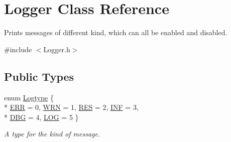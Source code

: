 \hypertarget{classLogger}{\section{Logger Class Reference}
\label{classLogger}
}


Prints messages of different kind, which can all be enabled and disabled.  




{\ttfamily \#include $<$Logger.\-h$>$}

\subsection*{Public Types}
\begin{DoxyCompactItemize}
\item 
enum \hyperlink{classLogger_ac9e601f90bf326ce2088de52018861dc}{Logtype} \{ \\*
\hyperlink{classLogger_ac9e601f90bf326ce2088de52018861dca482a49db2a0d40e2ae358619edb1633e}{E\-R\-R} =  0, 
\hyperlink{classLogger_ac9e601f90bf326ce2088de52018861dca90d291baa55088591aae64883cfc58bd}{W\-R\-N} =  1, 
\hyperlink{classLogger_ac9e601f90bf326ce2088de52018861dca97ed8522dfcbb2cdf29c7f46e583f42f}{R\-E\-S} =  2, 
\hyperlink{classLogger_ac9e601f90bf326ce2088de52018861dca174739f9b95ebbf75fbb89001f72443b}{I\-N\-F} =  3, 
\\*
\hyperlink{classLogger_ac9e601f90bf326ce2088de52018861dcaecb59ecf12f943da56b6944a3053dc09}{D\-B\-G} =  4, 
\hyperlink{classLogger_ac9e601f90bf326ce2088de52018861dca07be7495a7931bee16f5d94b3671f5de}{L\-O\-G} =  5
 \}
\begin{DoxyCompactList}\small\item\em A type for the kind of message. \end{DoxyCompactList}\end{DoxyCompactItemize}
